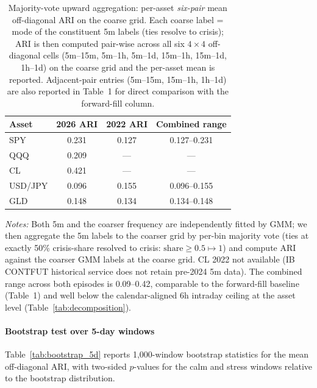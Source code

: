 \documentclass[preprint,12pt,authoryear]{elsarticle}
\newcommand{\CL}{CL}
\begin{document}
\begin{table}[H]
\centering
\small
\setlength{\tabcolsep}{6pt}
\caption{Majority-vote upward aggregation: per-asset \emph{six-pair} mean off-diagonal ARI on the coarse grid. Each coarse label = mode of the constituent 5m labels (ties resolve to crisis); ARI is then computed pair-wise across all six $4 \times 4$ off-diagonal cells (5m--15m, 5m--1h, 5m--1d, 15m--1h, 15m--1d, 1h--1d) on the coarse grid and the per-asset mean is reported. Adjacent-pair entries (5m--15m, 15m--1h, 1h--1d) are also reported in Table~1 for direct comparison with the forward-fill column.}
\label{tab:majority_vote}
\begin{tabular}{lccc}
\toprule
Asset & 2026 ARI & 2022 ARI & Combined range \\
\midrule
SPY & 0.231 & 0.127 & 0.127--0.231 \\
QQQ & 0.209 & --- & --- \\
CL & 0.421 & --- & --- \\
USD/JPY & 0.096 & 0.155 & 0.096--0.155 \\
GLD & 0.148 & 0.134 & 0.134--0.148 \\
\bottomrule
\end{tabular}
\par\medskip
{\footnotesize\justifying
\textit{Notes:} Both 5m and the coarser frequency are independently fitted by GMM; we then aggregate the 5m labels to the coarser grid by per-bin majority vote (ties at exactly 50\% crisis-share resolved to crisis: $\text{share} \ge 0.5 \mapsto 1$) and compute ARI against the coarser GMM labels at the coarse grid. \CL{} 2022 not available (IB CONTFUT historical service does not retain pre-2024 5m data). The combined range across both episodes is 0.09--0.42, comparable to the forward-fill baseline (Table~1) and well below the calendar-aligned 6h intraday ceiling at the asset level (Table~\ref{tab:decomposition}).
\par}
\end{table}

\paragraph{Bootstrap test over 5-day windows}
Table~\ref{tab:bootstrap_5d} reports 1{,}000-window bootstrap statistics for the mean off-diagonal ARI, with two-sided $p$-values for the calm and stress windows relative to the bootstrap distribution.
\end{document}
